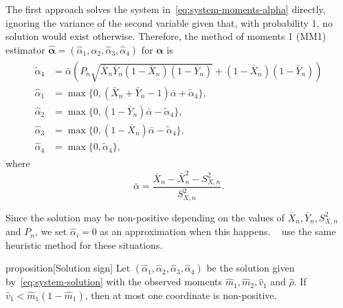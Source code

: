 \documentclass[a4paper, notitlepage, 10pt]{article}
\theoremstyle{definition}
\begin{document}
The first approach solves the system in~\eqref{eq:system-moments-alpha} directly, ignoring the variance of the second variable given that, with probability 1, no solution would exist otherwise.
Therefore, the method of moments 1 (MM1) estimator $\hat{\boldsymbol{\alpha}} = (\hat\alpha_1, \hat\alpha_2, \hat\alpha_3, \hat\alpha_4)$ for $\boldsymbol{\alpha}$ is
\begin{gather}
    \label{eq:MM1}
    \begin{aligned}
    \tilde{\alpha}_4 &= \bar{\alpha}\left(P_n\sqrt{\bar{X}_n\bar{Y}_n(1-\bar{X}_n)(1-\bar{Y}_n)} + (1-\bar{X}_n)(1-\bar{Y}_n)\right) \\
    \hat{\alpha}_1 &= \max\{0, (\bar{X}_n + \bar{Y}_n - 1)\bar{\alpha} + \tilde{\alpha}_4\}, \\
    \hat{\alpha}_2 &= \max\{0,  (1 - \bar{Y}_n)\bar{\alpha} - \tilde{\alpha}_4\}, \\
    \hat{\alpha}_3 &= \max\{0, (1-\bar{X}_n)\bar{\alpha} - \tilde{\alpha}_4\}, \\
    \hat{\alpha}_4 &= \max\{0, \tilde{\alpha}_4 \},
    \end{aligned}
\end{gather}
where
\begin{equation*}
    \bar{\alpha} = \frac{\bar{X}_n - \bar{X}_n^2 - S_{X,n}^2}{S_{X,n}^2}.
\end{equation*}

Since the solution may be non-positive depending on the values of $\bar{X}_n, \bar{Y}_n, S_{X,n}^2$ and $P_n$, we set $\hat{\alpha}_i = 0$ as an approximation when this happens. 
~\cite{arnold2011flexible} use the same heuristic method for these situations. 

\begin{theoremEnd}{proposition}[Solution sign]
    Let $(\hat{\alpha}_1, \hat{\alpha}_2, \hat{\alpha}_3, \hat{\alpha}_4)$ be the solution given by~\eqref{eq:system-solution} with the observed moments $\hat{m}_1, \hat{m}_2, \hat{v}_1$ and $\hat\rho$. 
    If $\hat{v}_1 < \hat{m}_1(1-\hat{m}_1)$, then at most one coordinate is non-positive.
\end{theoremEnd}
\end{document}
